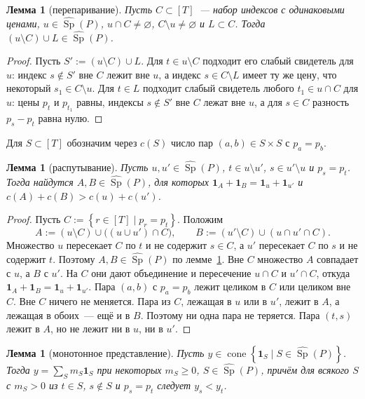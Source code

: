 \documentclass[a4paper,11pt]{article}
\theoremstyle{plain}
\newtheorem{lemma}[theorem]{Лемма}
\theoremstyle{definition}
\theoremstyle{remark}
\newcommand{\set}[1]{\left\{ #1 \right\}}
\DeclareMathOperator{\cone}{cone}
\DeclareMathOperator{\Sp}{Sp}
\begin{document}
\begin{lemma}[перепаривание]\label{lem:rematch}
    Пусть $C\subset[T]$~--- набор индексов с одинаковыми ценами, $u\in\widehat{\Sp}(P)$, $u\cap C\ne\varnothing$, $C\setminus u\ne\varnothing$ и $L\subset C$. Тогда $(u\setminus C)\cup L\in\widehat{\Sp}(P)$.
\end{lemma}

\begin{proof}
    Пусть $S':=(u\setminus C)\cup L$. Для $t\in u\setminus C$ подходит его слабый свидетель для $u$: индекс $s\notin S'$ вне $C$ лежит вне $u$, а индекс $s\in C\setminus L$ имеет ту же цену, что некоторый $s_1\in C\setminus u$. Для $t\in L$ подходит слабый свидетель любого $t_1\in u\cap C$ для $u$: цены $p_t$ и $p_{t_1}$ равны, индексы $s\notin S'$ вне $C$ лежат вне $u$, а для $s\in C$ разность $p_s-p_t$ равна нулю.
\end{proof}

Для $S\subset[T]$ обозначим через $c(S)$ число пар $(a,b)\in S\times S$ с $p_a=p_b$.

\begin{lemma}[распутывание]\label{lem:uncross}
    Пусть $u,u'\in\widehat{\Sp}(P)$, $t\in u\setminus u'$, $s\in u'\setminus u$ и $p_s=p_t$. Тогда найдутся $A,B\in\widehat{\Sp}(P)$, для которых $\mathbf 1_A+\mathbf 1_B=\mathbf 1_u+\mathbf 1_{u'}$ и $c(A)+c(B)>c(u)+c(u')$.
\end{lemma}

\begin{proof}
    Пусть $C:=\set{r\in[T]\mid p_r=p_t}$. Положим
    \[
        A:=(u\setminus C)\cup\bigl((u\cup u')\cap C\bigr),\qquad B:=(u'\setminus C)\cup(u\cap u'\cap C).
    \]
    Множество $u$ пересекает $C$ по $t$ и не содержит $s\in C$, а $u'$ пересекает $C$ по $s$ и не содержит $t$. Поэтому $A,B\in\widehat{\Sp}(P)$ по лемме~\ref{lem:rematch}. Вне $C$ множество $A$ совпадает с $u$, а $B$ с $u'$. На $C$ они дают объединение и пересечение $u\cap C$ и $u'\cap C$, откуда $\mathbf 1_A+\mathbf 1_B=\mathbf 1_u+\mathbf 1_{u'}$.
    Пара $(a,b)$ с $p_a=p_b$ лежит целиком в $C$ или целиком вне $C$. Вне $C$ ничего не меняется. Пара из $C$, лежащая в $u$ или в $u'$, лежит в $A$, а лежащая в обоих~--- ещё и в $B$. Поэтому ни одна пара не теряется. Пара $(t,s)$ лежит в $A$, но не лежит ни в $u$, ни в $u'$.
\end{proof}

\begin{lemma}[монотонное представление]\label{lem:monotone}
    Пусть $y\in\cone\set{\mathbf 1_S\mid S\in\widehat{\Sp}(P)}$. Тогда $y=\sum_Sm_S\mathbf 1_S$ при некоторых $m_S\ge0$, $S\in\widehat{\Sp}(P)$, причём для всякого $S$ с $m_S>0$ из $t\in S$, $s\notin S$ и $p_s=p_t$ следует $y_s<y_t$.
\end{lemma}
\end{document}
